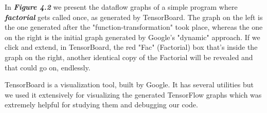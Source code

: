 \documentclass[ack,preface]{dithesis}
\begin{document}
In  \textit{\textbf{Figure 4.2}} we present the dataflow graphs of a simple program where \textit{\textbf{factorial}} gets called once, as generated by TensorBoard. 
The graph on the left is the one generated after the "function-transformation" took place, whereas the one on the right is the initial graph generated by Google's "dynamic" approach.
If we click and extend, in TensorBoard, the red "Fac" (Factorial) box that's inside the graph on the right, another identical copy of the Factorial will be revealed and that could go on, endlessly.

TensorBoard is a visualization tool, built by Google. It has several utilities but we used it extensively for visualizing the generated TensorFlow graphs which was extremely helpful for studying them and debugging our code.\\\\\\\\\\\\\\\\\\\\\\\\
\end{document}
